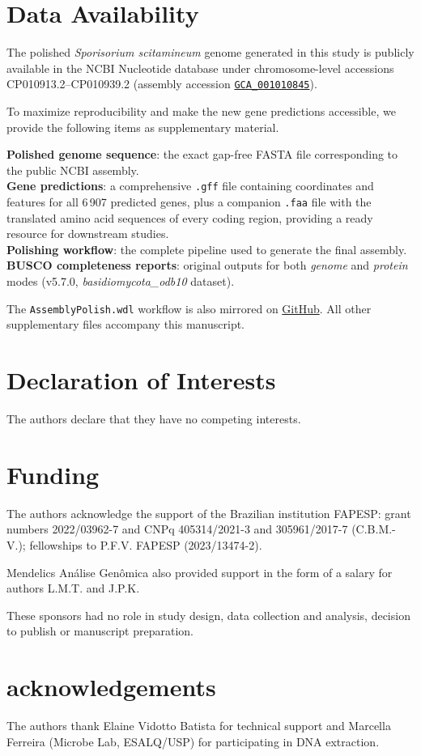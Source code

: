 \documentclass[Journal,letterpaper]{ascelike-new}
\begin{document}
\section*{Data Availability}

The polished \textit{Sporisorium scitamineum} genome generated in this study is publicly available in the NCBI Nucleotide database under chromosome-level accessions CP010913.2–CP010939.2 (assembly accession \href{https://www.ncbi.nlm.nih.gov/datasets/genome/GCA_001010845}{\texttt{GCA\_001010845}}).

To maximize reproducibility and make the new gene predictions accessible, we provide the following items as supplementary material.

\noindent\textbf{Polished genome sequence}: the exact gap-free FASTA file corresponding to the public NCBI assembly.\\
\textbf{Gene predictions}: a comprehensive \texttt{.gff} file containing coordinates and features for all 6\,907 predicted genes, plus a companion \texttt{.faa} file with the translated amino acid sequences of every coding region, providing a ready resource for downstream studies.\\
\textbf{Polishing workflow}: the complete pipeline used to generate the final assembly.\\
\textbf{BUSCO completeness reports}: original outputs for both \textit{genome} and \textit{protein} modes (v5.7.0, \textit{basidiomycota\_odb10} dataset).

The \texttt{AssemblyPolish.wdl} workflow is also mirrored on \href{https://github.com/lmtani/s-scitamineum-pipelines}{GitHub}. All other supplementary files accompany this manuscript.

\section*{Declaration of Interests}

The authors declare that they have no competing interests.

\section*{Funding}

The authors acknowledge the support of the Brazilian institution FAPESP: grant numbers 2022/03962-7 and CNPq 405314/2021-3 and 305961/2017-7 (C.B.M.-V.); fellowships to P.F.V. FAPESP (2023/13474-2).

Mendelics Análise Genômica also provided support in the form of a salary for authors L.M.T. and J.P.K.

These sponsors had no role in study design, data collection and analysis, decision to publish or manuscript preparation.

\section*{acknowledgements}

The authors thank Elaine Vidotto Batista for technical support and Marcella Ferreira (Microbe Lab, ESALQ/USP) for participating in DNA extraction.


\end{document}
